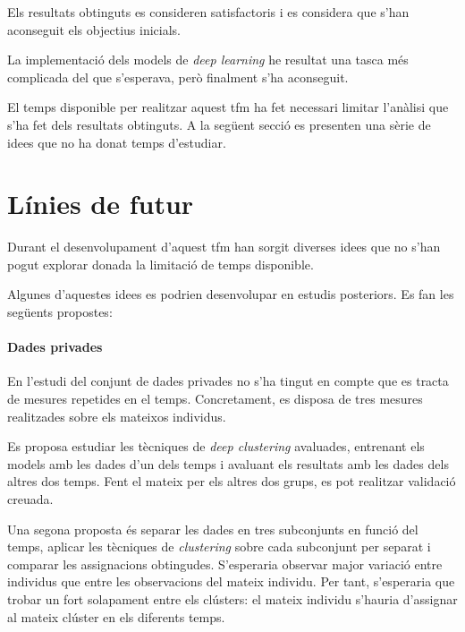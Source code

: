 \documentclass[CAT,BIB]{TFUOC}%
\begin{document}
        Els resultats obtinguts es consideren satisfactoris
        i es considera que s'han aconseguit els objectius inicials.

        La implementació dels models de \textit{deep learning}
        he resultat una tasca més complicada del que s'esperava,
        però finalment s'ha aconseguit.

        El temps disponible per realitzar aquest \gls{tfm}
        ha fet necessari limitar l'anàlisi que s'ha fet dels resultats obtinguts.
        A la següent secció es presenten una sèrie de idees
        que no ha donat temps d'estudiar.



    \section{Línies de futur}
    \label{s:futur}

        Durant el desenvolupament d'aquest \gls{tfm}
        han sorgit diverses idees que no s'han pogut explorar
        donada la limitació de temps disponible.

        Algunes d'aquestes idees es podrien desenvolupar
        en estudis posteriors.
        Es fan les següents propostes:

        \paragraph{Dades \gls{privades}}
            En l'estudi del conjunt de dades \gls{privades}
            no s'ha tingut en compte que es tracta de mesures repetides en el temps.
            Concretament,
            es disposa de tres mesures realitzades sobre els mateixos individus.

            Es proposa estudiar les tècniques de \textit{deep clustering} avaluades,
            entrenant els models amb les dades d'un dels temps
            i avaluant els resultats amb les dades dels altres dos temps.
            Fent el mateix per els altres dos grups,
            es pot realitzar validació creuada.

            Una segona proposta és separar les dades en tres subconjunts en funció del temps,
            aplicar les tècniques de \textit{clustering} sobre cada subconjunt per separat
            i comparar les assignacions obtingudes.
            S'esperaria observar major variació entre individus
            que entre les observacions del mateix individu.
            Per tant, s'esperaria que trobar un fort solapament entre els clústers:
            el mateix individu s'hauria d'assignar al mateix clúster en els diferents temps.
\end{document}
